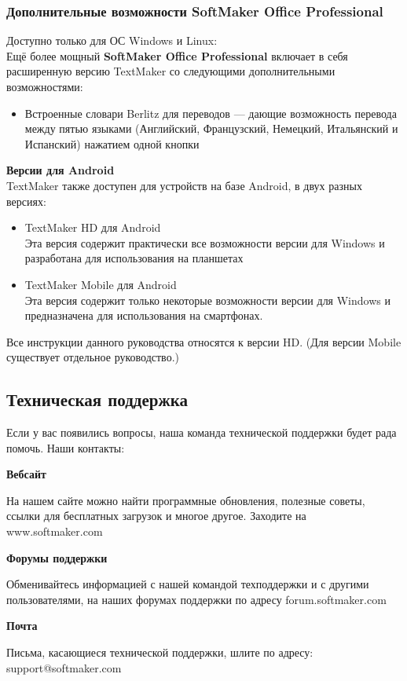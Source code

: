 ﻿\documentclass[a4paper,10pt]{article}
\begin{document}
\subsubsection{Дополнительные возможности SoftMaker Office Professional}
Доступно только для ОС Windows и Linux:\\
Ещё более мощный \textbf{SoftMaker Office Professional} включает в себя расширенную версию TextMaker со следующими дополнительными возможностями:
\begin{itemize}
 \item Встроенные словари Berlitz для переводов — дающие возможность перевода между пятью языками (Английский, Французский, Немецкий, Итальянский и Испанский) нажатием одной кнопки
\end{itemize}
\textbf{Версии для Android}\\
TextMaker также доступен для устройств на базе Android, в двух разных версиях:
\begin{itemize}
 \item TextMaker HD для Android\\
Эта версия содержит практически  все возможности версии для Windows и разработана для использования на планшетах
\item TextMaker Mobile для Android\\
Эта версия содержит только некоторые возможности версии для Windows и предназначена для использования на смартфонах.
\end{itemize}
Все инструкции данного руководства относятся к версии HD. (Для версии Mobile существует отдельное руководство.)
\subsection{Техническая поддержка}
Если у вас появились вопросы, наша команда технической поддержки будет рада помочь. Наши контакты:

\textbf{Вебсайт}

На нашем сайте можно найти программные обновления, полезные советы, ссылки для бесплатных загрузок и многое другое. Заходите на www.softmaker.com

\textbf{Форумы поддержки}

Обменивайтесь информацией с нашей командой техподдержки и с другими пользователями, на наших форумах поддержки по адресу forum.softmaker.com

\textbf{Почта}

Письма, касающиеся технической поддержки, шлите по адресу: support@softmaker.com
\end{document}
